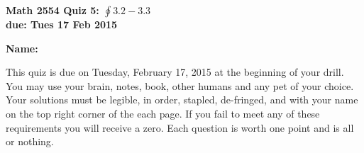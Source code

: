\documentclass[12pt,letterpaper]{article}
\begin{document}
\flushleft
\begin{multicols}{2}


\textbf{Math 2554 Quiz 5: $\oint 3.2-3.3$ \\
due: Tues 17 Feb 2015}

\textbf{Name:  }\underline{\hspace{35ex}}

\vspace{.5in}

\end{multicols}

\pagestyle{empty}

\flushleft
This quiz is due on Tuesday, February 17, 2015 at the beginning of your drill. You may use your
brain, notes, book, other humans and any pet of your choice. Your solutions must be legible, in order, stapled, de-fringed, and with your name on the top right corner of the each page. If you fail to meet any of these requirements you will receive a zero. Each question is worth one point and is all or nothing.
\end{document}
